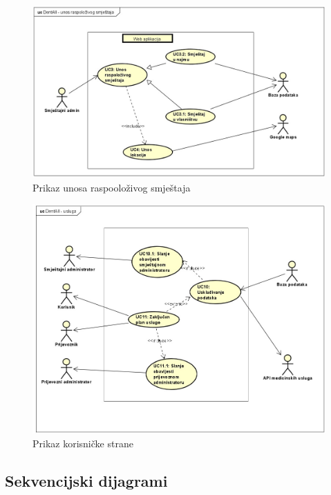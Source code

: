 				\begin{figure}[H]
					\includegraphics[width=\linewidth]{slike/DentAll_UnosRaspoloživogSmještaja.png} 
					\centering
					\caption{Prikaz unosa raspooloživog smještaja}
					\label{fig:unosSmještaja}
				\end{figure}
				
				\begin{figure}[H]
					\includegraphics[width=\linewidth]{slike/DentAll_Usluga.png}
					\centering
					\caption{Prikaz korisničke strane}
					\label{fig:korisnik}
				\end{figure}
				
			\subsection{Sekvencijski dijagrami}
				
